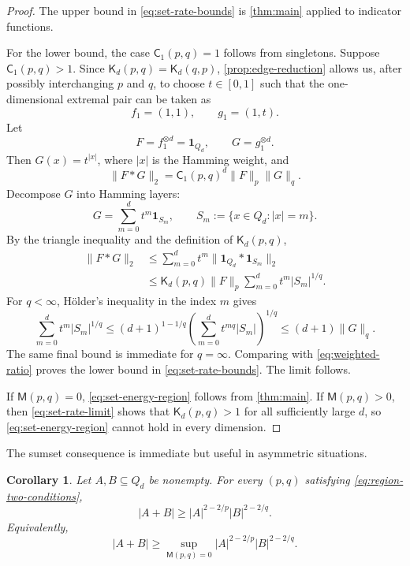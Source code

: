 \documentclass[11pt,reqno]{amsart}
\numberwithin{equation}{section}
\newtheorem{corollary}[corollary]{Corollary}
\theoremstyle{definition}
\theoremstyle{remark}
\newcommand{\one}{\mathbf 1}
\newcommand{\Cpqr}{\mathsf C}
\newcommand{\Kpq}{\mathsf K}
\newcommand{\Mu}{\mathsf M}
\begin{document}
\begin{proof}
The upper bound in \eqref{eq:set-rate-bounds} is \cref{thm:main} applied to indicator functions.

For the lower bound, the case $\Cpqr_1(p,q)=1$ follows from singletons.  Suppose $\Cpqr_1(p,q)>1$.  Since $\Kpq_d(p,q)=\Kpq_d(q,p)$, \cref{prop:edge-reduction} allows us, after possibly interchanging $p$ and $q$, to choose $t\in[0,1]$ such that the one-dimensional extremal pair can be taken as
\[
  f_1=(1,1),
  \qquad
  g_1=(1,t).
\]
Let
\[
  F=f_1^{\otimes d}=\one_{Q_d},
  \qquad
  G=g_1^{\otimes d}.
\]
Then $G(x)=t^{|x|}$, where $|x|$ is the Hamming weight, and
\begin{equation}\label{eq:weighted-ratio}
  \|F*G\|_2
  =\Cpqr_1(p,q)^d\|F\|_p\|G\|_q.
\end{equation}
Decompose $G$ into Hamming layers:
\[
  G=\sum_{m=0}^d t^m\one_{S_m},
  \qquad
  S_m:=\{x\in Q_d:|x|=m\}.
\]
By the triangle inequality and the definition of $\Kpq_d(p,q)$,
\begin{align*}
  \|F*G\|_2
  &\le \sum_{m=0}^d t^m\|\one_{Q_d}*\one_{S_m}\|_2\\
  &\le \Kpq_d(p,q)\|F\|_p
  \sum_{m=0}^d t^m|S_m|^{1/q}.
\end{align*}
For $q<\infty$, H\"older's inequality in the index $m$ gives
\[
  \sum_{m=0}^d t^m|S_m|^{1/q}
  \le(d+1)^{1-1/q}
  \left(\sum_{m=0}^d t^{mq}|S_m|\right)^{1/q}
  \le(d+1)\|G\|_q.
\]
The same final bound is immediate for $q=\infty$.  Comparing with \eqref{eq:weighted-ratio} proves the lower bound in \eqref{eq:set-rate-bounds}.  The limit follows.

If $\Mu(p,q)=0$, \eqref{eq:set-energy-region} follows from \cref{thm:main}.  If $\Mu(p,q)>0$, then \eqref{eq:set-rate-limit} shows that $\Kpq_d(p,q)>1$ for all sufficiently large $d$, so \eqref{eq:set-energy-region} cannot hold in every dimension.
\end{proof}

The sumset consequence is immediate but useful in asymmetric situations.

\begin{corollary}\label{cor:sumset}
Let $A,B\subseteq Q_d$ be nonempty.  For every $(p,q)$ satisfying \eqref{eq:region-two-conditions},
\begin{equation}\label{eq:sumset-bound}
  |A+B|
  \ge
  |A|^{2-2/p}|B|^{2-2/q}.
\end{equation}
Equivalently,
\begin{equation}\label{eq:sumset-optimised}
  |A+B|
  \ge
  \sup_{\Mu(p,q)=0}
  |A|^{2-2/p}|B|^{2-2/q}.
\end{equation}
\end{corollary}
\end{document}
